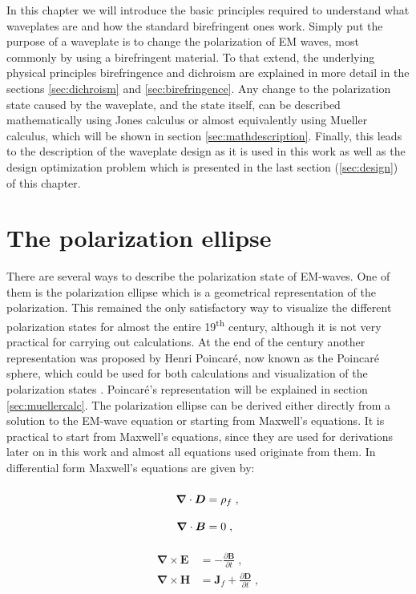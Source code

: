 In this chapter we will introduce the basic principles required to understand what waveplates are and how the standard birefringent ones work. Simply put the purpose of a waveplate is to change the polarization of EM waves, most commonly by using a birefringent material. To that extend, the underlying physical principles birefringence and dichroism are explained in more detail in the sections \ref{sec:dichroism} and \ref{sec:birefringence}. Any change to the polarization state caused by the waveplate, and the state itself, can be described mathematically using Jones calculus or almost equivalently using Mueller calculus, which will be shown in section \ref{sec:mathdescription}. Finally, this leads to the description of the waveplate design as it is used in this work as well as the design optimization problem which is presented in the last section (\ref{sec:design}) of this chapter.

\section{The polarization ellipse}
\label{sec:polellipse}
There are several ways to describe the polarization state of EM-waves. One of them is the polarization ellipse which is a geometrical representation of the polarization. This remained the only satisfactory way to visualize the different polarization states for almost the entire 19\textsuperscript{th} century, although it is not very practical for carrying out calculations. At the end of the century another representation was proposed by Henri Poincaré, now known as the Poincaré sphere, which could be used for both calculations and visualization of the polarization states \cite{Collett2008VisualizationSphere}. Poincaré's representation will be explained in section \ref{sec:muellercalc}. The polarization ellipse can be derived either directly from a solution to the EM-wave equation or starting from Maxwell's equations.  It is practical to start from Maxwell's equations, since they are used for derivations later on in this work and almost all equations used originate from them. In differential form Maxwell's equations are given by: 
\par
\noindent\begin{minipage}{.5\linewidth}
\begin{align}
    \bm{\nabla}\cdot\bm{D} &=\rho_{f}\;,\label{eq:maxwell1}
    \vphantom{\frac{\partial\bm{B}}{\partial t}}\\
    \bm{\nabla}\cdot\bm{B} &=0\;,\vphantom{\frac{\partial\bm{B}}{\partial t}}\label{eq:maxwell2}
\end{align}
\end{minipage}%
\begin{minipage}{.5\linewidth}
\begin{align}
    \bm{\nabla}\times\bm{E} &=-\frac{\partial\bm{B}}{\partial t}\;,\label{eq:maxwell3}
    \\
    \bm{\nabla}\times\bm{H} &=\bm{J}_f
    +\frac{\partial\bm{D}}{\partial t}\;,\label{eq:maxwell4}
\end{align}
\end{minipage}
\newline

